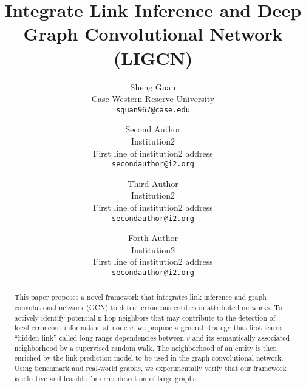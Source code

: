 \documentclass[10pt,twocolumn,letterpaper]{article}
\begin{document}
\title{Integrate Link Inference and Deep Graph Convolutional Network (LIGCN)}

\author{Sheng Guan\\
Case Western Reserve University\\
{\tt\small sguan967@case.edu}
\and
Second Author\\
Institution2\\
First line of institution2 address\\
{\tt\small secondauthor@i2.org}
\and 
Third Author\\
Institution2\\
First line of institution2 address\\
{\tt\small secondauthor@i2.org}
\and 
Forth Author\\
Institution2\\
First line of institution2 address\\
{\tt\small secondauthor@i2.org}
}

\maketitle

\begin{abstract}
This paper proposes a novel framework that integrates link inference and graph convolutional network (GCN) to detect erroneous entities in attributed networks. To actively identify potential n-hop neighbors that may contribute to the detection of local erroneous information at node $v$, we propose a general strategy that first learns ``hidden link'' called long-range dependencies between $v$ and its semantically associated neighborhood by a supervised random walk. The neighborhood of an entity is then enriched by the link prediction model to be used in the graph convolutional network. Using benchmark and real-world graphs, we experimentally verify that our framework is effective and feasible for error detection of large graphs. 
\end{abstract}














{\small
%
\setlength{\bibsep}{0pt}


}
\end{document}
